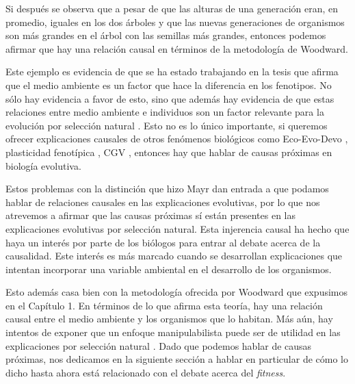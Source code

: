 \begin{center}
\end{center}

Si después se observa que a pesar de que las alturas de una generación eran, en promedio, iguales en los dos árboles y que las nuevas generaciones de organismos son más grandes en el árbol con las semillas más grandes, entonces podemos afirmar que hay una relación causal en términos de la metodología de Woodward.

Este ejemplo es evidencia de que se ha estado trabajando en la tesis que afirma que el medio ambiente es un factor que hace la
diferencia en los fenotipos. No sólo hay evidencia a favor de esto, sino que además hay evidencia de que estas relaciones entre medio ambiente e individuos son un factor relevante para la evolución por selección natural \cite{Jablonka2020, Dayan2020, MacColl2011}. Esto no es lo único importante, si queremos ofrecer explicaciones causales de otros fenómenos biológicos como Eco-Evo-Devo \cite{PfenningEco-Evo-Devo}, plasticidad fenotípica \cite{WESTEBERHARD20082701}, CGV \cite{CVG}, entonces hay que hablar de causas próximas en biología evolutiva.

Estos problemas con la distinción que hizo Mayr dan entrada a que podamos hablar de relaciones causales en las explicaciones evolutivas, por lo que nos atrevemos a afirmar que las causas próximas sí están presentes en las explicaciones evolutivas por selección natural. Esta injerencia causal ha hecho que haya un interés por parte de los biólogos para entrar al debate acerca de la causalidad. Este interés es más marcado cuando se desarrollan explicaciones que intentan incorporar una variable ambiental en el desarrollo de los organismos.

Esto además casa bien con la metodología ofrecida por Woodward que expusimos en el Capítulo 1. En términos de lo que afirma esta teoría, hay una relación causal entre el medio ambiente y los organismos que lo habitan. Más aún, hay intentos de exponer que un enfoque manipulabilista puede ser de utilidad en las explicaciones por selección natural \cite{MacColl2011}. Dado que podemos hablar de causas próximas, nos dedicamos en la siguiente sección a hablar en particular de cómo lo dicho hasta ahora está relacionado con el debate acerca del \emph{fitness}.

